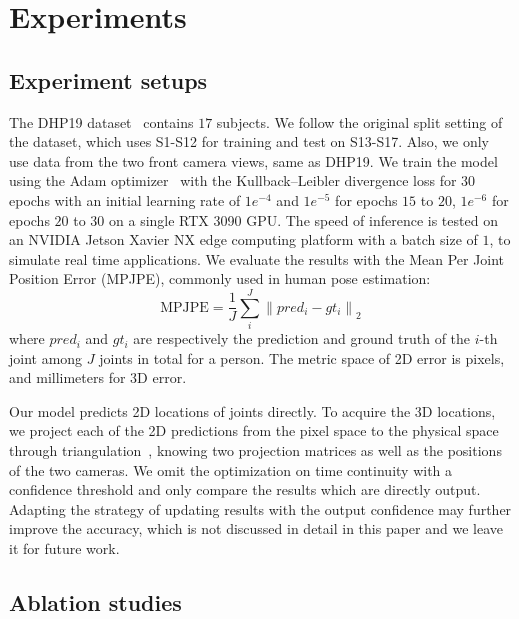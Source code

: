 \documentclass[10pt,twocolumn,letterpaper]{article}
\begin{document}
\section{Experiments}

\subsection{Experiment setups}

The DHP19 dataset~\cite{calabrese2019dhp19} contains $17$ subjects.
We follow the original split setting of the dataset, which uses S1-S12 for training and test on S13-S17.
Also, we only use data from the two front camera views, same as DHP19.
We train the model using the Adam optimizer~\cite{kingma2014adam} with the Kullback–Leibler divergence loss for $30$ epochs with an initial learning rate of $1e^{-4}$ and $1e^{-5}$ for epochs $15$ to $20$, $1e^{-6}$ for epochs $20$ to $30$ on a single RTX 3090 GPU. The speed of inference is tested on an NVIDIA Jetson Xavier NX edge computing platform with a batch size of $1$, to simulate real time applications. We evaluate the results with the Mean Per Joint Position Error (MPJPE), commonly used in human pose estimation:
\begin{equation}\label{eq:11}
\mathrm{MPJPE}=\frac{1}{J} \sum_{i}^{J}\left\| pred_{i}-gt_{i} \right\|_{2}
\end{equation}
where $pred_{i}$ and $gt_{i}$ are respectively the prediction and ground truth of the $i$-th joint among $J$ joints in total for a person. The metric space of 2D error is pixels, and millimeters for 3D error.

Our model predicts 2D locations of joints directly.
To acquire the 3D locations, we project each of the 2D predictions from the pixel space to the physical space through triangulation~\cite{calabrese2019dhp19}, knowing two projection matrices as well as the positions of the two cameras. We omit the optimization on time continuity with a confidence threshold and only compare the results which are directly output.
Adapting the strategy of updating results with the output confidence may further improve the accuracy, which is not discussed in detail in this paper and we leave it for future work.

\subsection{Ablation studies}
\label{sec:ablation_studies}
\end{document}
